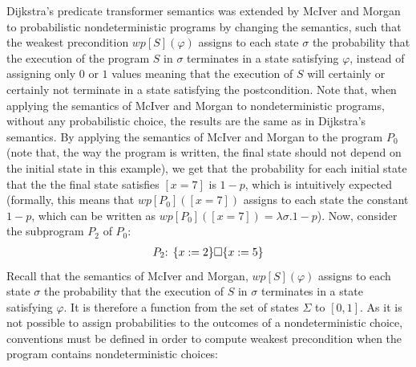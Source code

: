 \documentclass[a4paper,10pt]{llncs}
\begin{document}
Dijkstra's predicate transformer semantics was extended by McIver and Morgan \cite{McIver05} to probabilistic nondeterministic programs by changing the semantics, such that the weakest precondition $wp[S](\varphi)$ assigns to each state $\sigma$ the probability that the execution of the program $S$ in $\sigma$ terminates in a state satisfying $\varphi$, instead of assigning only $0$ or $1$ values meaning that the execution of $S$ will certainly or certainly not terminate in a state satisfying the postcondition. Note that, when applying the semantics of McIver and Morgan to nondeterministic programs, without any probabilistic choice, the results are the same as in Dijkstra's semantics.\newline
By applying the semantics of McIver and Morgan to the program $P_0$ (note that, the way the program is written, the final state should not depend on the initial state in this example), we get that the probability for each initial state that the the final state satisfies $[x = 7]$ is $1-p$, which is intuitively expected (formally, this means that $wp[P_0]([x = 7])$ assigns to each state the constant $1-p$, which can be written as $wp[P_0]([x = 7]) = \lambda\sigma. 1-p$). Now, consider the subprogram $P_2$ of $P_0$:
\begin{align*}
 P_2\textnormal{: } \{x := 2\} \square \{x := 5\} 
\end{align*}
Recall that the semantics of McIver and Morgan, $wp[S](\varphi)$ assigns to each state $\sigma$ the probability that the execution of $S$ in $\sigma$ terminates in a state satisfying $\varphi$. It is therefore a function from the set of states $\Sigma$ to $[0,1]$.
As it is not possible to assign probabilities to the outcomes of a nondeterministic choice, conventions must be defined in order to compute weakest precondition when the program contains nondeterministic choices:
\end{document}
